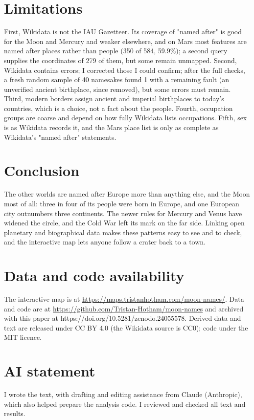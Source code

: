 \documentclass[11pt,a4paper]{article}
\begin{document}
\section{Limitations}
First, Wikidata is not the IAU Gazetteer. Its coverage of "named after" is good for the Moon and Mercury and weaker elsewhere, and on Mars most features are named after places rather than people (350 of 584, 59.9\%); a second query supplies the coordinates of 279 of them, but some remain unmapped. Second, Wikidata contains errors; I corrected those I could confirm; after the full checks, a fresh random sample of 40 namesakes found 1 with a remaining fault (an unverified ancient birthplace, since removed), but some errors must remain. Third, modern borders assign ancient and imperial birthplaces to today's countries, which is a choice, not a fact about the people. Fourth, occupation groups are coarse and depend on how fully Wikidata lists occupations. Fifth, sex is as Wikidata records it, and the Mars place list is only as complete as Wikidata's "named after" statements.

\section{Conclusion}
The other worlds are named after Europe more than anything else, and the Moon most of all: three in four of its people were born in Europe, and one European city outnumbers three continents. The newer rules for Mercury and Venus have widened the circle, and the Cold War left its mark on the far side. Linking open planetary and biographical data makes these patterns easy to see and to check, and the interactive map lets anyone follow a crater back to a town.

\section*{Data and code availability}
The interactive map is at \url{https://maps.tristanhotham.com/moon-names/}. Data and code are at \url{https://github.com/Tristan-Hotham/moon-names} and archived with this paper at https://doi.org/10.5281/zenodo.24055578. Derived data and text are released under CC BY 4.0 (the Wikidata source is CC0); code under the MIT licence.

\section*{AI statement}
I wrote the text, with drafting and editing assistance from Claude (Anthropic), which also helped prepare the analysis code. I reviewed and checked all text and results.
\end{document}
